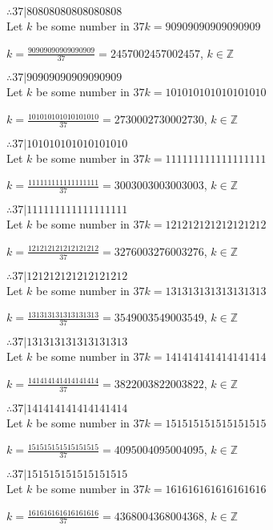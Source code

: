 \documentclass{article}
\begin{document}
$ \therefore  37|80808080808080808 $ \\

Let $k$ be some number in $37k = 90909090909090909$

$k = \frac{90909090909090909}{37} = 2457002457002457$, $k \in \mathbb{Z}$

$ \therefore  37|90909090909090909 $ \\

Let $k$ be some number in $37k = 101010101010101010$

$k = \frac{101010101010101010}{37} = 2730002730002730$, $k \in \mathbb{Z}$

$ \therefore  37|101010101010101010 $ \\

Let $k$ be some number in $37k = 111111111111111111$

$k = \frac{111111111111111111}{37} = 3003003003003003$, $k \in \mathbb{Z}$

$ \therefore  37|111111111111111111 $ \\

Let $k$ be some number in $37k = 121212121212121212$

$k = \frac{121212121212121212}{37} = 3276003276003276$, $k \in \mathbb{Z}$

$ \therefore  37|121212121212121212 $ \\

Let $k$ be some number in $37k = 131313131313131313$

$k = \frac{131313131313131313}{37} = 3549003549003549$, $k \in \mathbb{Z}$

$ \therefore  37|131313131313131313 $ \\

Let $k$ be some number in $37k = 141414141414141414$

$k = \frac{141414141414141414}{37} = 3822003822003822$, $k \in \mathbb{Z}$

$ \therefore  37|141414141414141414 $ \\

Let $k$ be some number in $37k = 151515151515151515$

$k = \frac{151515151515151515}{37} = 4095004095004095$, $k \in \mathbb{Z}$

$ \therefore  37|151515151515151515 $ \\

Let $k$ be some number in $37k = 161616161616161616$

$k = \frac{161616161616161616}{37} = 4368004368004368$, $k \in \mathbb{Z}$
\end{document}
